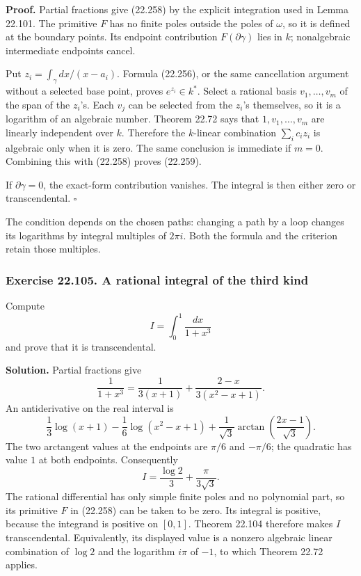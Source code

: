 \documentclass[
  11pt,
  a4paper,
]{article}
\begin{document}
\textbf{Proof.} Partial fractions give (22.258) by the explicit
integration used in Lemma 22.101. The primitive \(F\) has no finite
poles outside the poles of \(\omega\), so it is defined at the boundary
points. Its endpoint contribution \(F(\partial\gamma)\) lies in \(k\);
nonalgebraic intermediate endpoints cancel.

Put \(z_i=\int_\gamma dx/(x-a_i)\). Formula (22.256), or the same
cancellation argument without a selected base point, proves
\(e^{z_i}\in k^*\). Select a rational basis \(v_1,\ldots,v_m\) of the
span of the \(z_i\)'s. Each \(v_j\) can be selected from the \(z_i\)'s
themselves, so it is a logarithm of an algebraic number. Theorem 22.72
says that \(1,v_1,\ldots,v_m\) are linearly independent over \(k\).
Therefore the \(k\)-linear combination \(\sum_i c_iz_i\) is algebraic
only when it is zero. The same conclusion is immediate if \(m=0\).
Combining this with (22.258) proves (22.259).

If \(\partial\gamma=0\), the exact-form contribution vanishes. The
integral is then either zero or transcendental. \(\square\)

The condition depends on the chosen paths: changing a path by a loop
changes its logarithms by integral multiples of \(2\pi i\). Both the
formula and the criterion retain those multiples.

\subsubsection{Exercise 22.105. A rational integral of the third
kind}\label{exercise-22.105.-a-rational-integral-of-the-third-kind}

Compute \[
 I=\int_0^1\frac{dx}{1+x^3}
 \tag{22.260}
\] and prove that it is transcendental.

\textbf{Solution.} Partial fractions give \[
 \frac1{1+x^3}
   =\frac1{3(x+1)}
      +\frac{2-x}{3(x^2-x+1)}.
 \tag{22.261}
\] An antiderivative on the real interval is \[
 \frac13\log(x+1)-\frac16\log(x^2-x+1)
       +\frac1{\sqrt3}
          \arctan\left(\frac{2x-1}{\sqrt3}\right).
 \tag{22.262}
\] The two arctangent values at the endpoints are \(\pi/6\) and
\(-\pi/6\); the quadratic has value \(1\) at both endpoints.
Consequently \[
 I=\frac{\log2}{3}+\frac{\pi}{3\sqrt3}.
 \tag{22.263}
\] The rational differential has only simple finite poles and no
polynomial part, so its primitive \(F\) in (22.258) can be taken to be
zero. Its integral is positive, because the integrand is positive on
\([0,1]\). Theorem 22.104 therefore makes \(I\) transcendental.
Equivalently, its displayed value is a nonzero algebraic linear
combination of \(\log2\) and the logarithm \(i\pi\) of \(-1\), to which
Theorem 22.72 applies.
\end{document}
